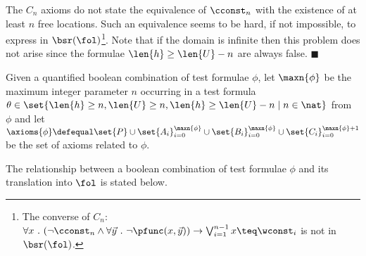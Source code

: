 \begin{remark}\label{rem:test-fol-card}
The $C_n$ axioms do not state the equivalence of $\cconst_n$ with the
existence of at least $n$ free locations. Such an equivalence seems to
be hard, if not impossible, to express in $\bsr(\fol)$\footnote{The
  converse of $C_n$: \(\forall x ~.~ (\neg \cconst_n \wedge \forall
  \vec{y}~.~ \neg \pfunc(x, \vec{y})) \rightarrow \bigvee_{i=1}^{n-1}
  x \teq \wconst_i\) is not in $\bsr(\fol)$.}. Note that if the domain
is infinite then this problem does not arise since the formulae
$\len{h} \geq \len{U} - n$ are always false.  \hfill$\blacksquare$
\end{remark}

\begin{definition}\label{def:maxn-axioms}
Given a quantified boolean combination of test formulae $\phi$, let
$\maxn{\phi}$ be the maximum integer parameter $n$ occurring in a test
formula $\theta \in \set{\len{h}\geq n, \len{U}\geq n,\len{h}\geq
  \len{U}-n \mid n \in \nat}$ from $\phi$ and let \(\axioms{\phi}
\defequal \set{P} \cup \set{A_i}_{i=0}^{\maxn{\phi}} \cup
\set{B_i}_{i=0}^{\maxn{\phi}} \cup \set{C_i}_{i=0}^{\maxn{\phi}+1}\)
be the set of axioms related to $\phi$.
\end{definition}

The relationship between %
a boolean combination of
test formulae $\phi$ and %
its translation into $\fol$ is
stated below. %
 
